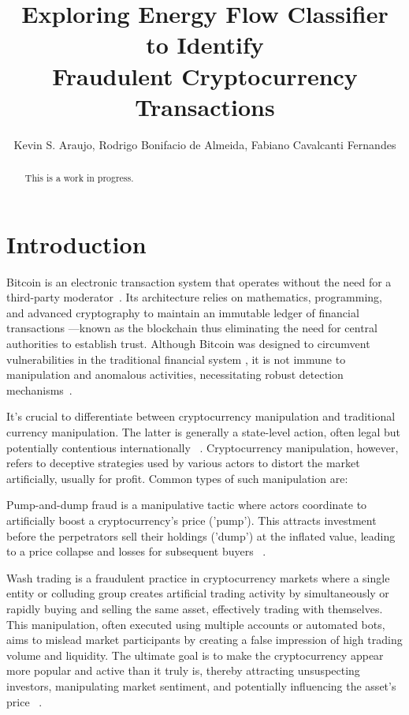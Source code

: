 \documentclass[12pt]{article}
\title{Exploring Energy Flow Classifier to Identify \\ Fraudulent Cryptocurrency Transactions}
\author{Kevin S. Araujo\inst{1}, Rodrigo Bonifacio de Almeida\inst{1}, 
  Fabiano Cavalcanti Fernandes\inst{2} }
\begin{document}
 

\maketitle

\begin{abstract}
  This is a work in progress.
\end{abstract}

\section{Introduction} \label{sec:introduction}

Bitcoin is an electronic transaction system that operates without the need for a third-party moderator~\cite{nakamoto2008bitcoin}.
Its architecture relies on mathematics, programming, and advanced cryptography to maintain an immutable ledger of financial
transactions ---known as the blockchain thus eliminating the need for central authorities to establish trust. 
Although Bitcoin was designed to circumvent vulnerabilities in the traditional financial system \cite{nakamoto2008bitcoin},
it is not immune to manipulation and anomalous activities, necessitating robust detection mechanisms~\cite{fang2022cryptocurrency,
zhang2020financial,zainal2018review}.

It's crucial to differentiate between cryptocurrency manipulation and traditional currency manipulation. The latter is
generally a state-level action, often legal but potentially contentious internationally ~\cite{domanski2011currency}.
Cryptocurrency manipulation, however, refers to deceptive strategies used by various actors to distort the market artificially,
usually for profit. Common types of such manipulation are:

Pump-and-dump fraud is a manipulative tactic where actors coordinate to artificially boost a cryptocurrency's price ('pump').
This attracts investment before the perpetrators sell their holdings ('dump') at the inflated value, leading to a price
collapse and losses for subsequent buyers ~\cite{karim2018manipulation}.

Wash trading is a fraudulent practice in cryptocurrency markets where a single entity or colluding group creates artificial
trading activity by simultaneously or rapidly buying and selling the same asset, effectively trading with themselves. This
manipulation, often executed using multiple accounts or automated bots, aims to mislead market participants by creating a
false impression of high trading volume and liquidity. The ultimate goal is to make the cryptocurrency appear more popular
and active than it truly is, thereby attracting unsuspecting investors, manipulating market sentiment, and potentially
influencing the asset's price ~\cite{gandal2018price, edelman2018detecting}.
\end{document}
